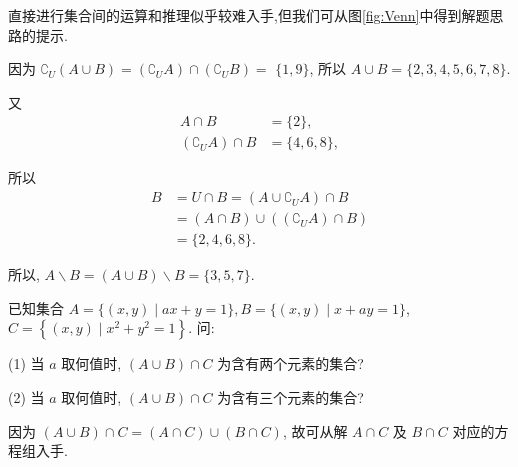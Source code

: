 \begin{analysis}
	直接进行集合间的运算和推理似乎较难入手,但我们可从图\ref{fig:Venn}中得到解题思路的提示.
\end{analysis}

\begin{solution}
	因为 $\complement_{U}(A \cup B)=\left(\complement_{U} A\right) \cap\left(\complement_{U} B\right)=$ $\{1,9\}$, 所以 $A \cup B=\{2,3,4,5,6,7,8\}$.

	又
	$$
		\begin{aligned}
			A \cap B                              & =\{2\},     \\
			\left(\complement_{U} A\right) \cap B & =\{4,6,8\},
		\end{aligned}
	$$




	所以
	$$
		\begin{aligned}
			B & =U \cap B=\left(A \cup \complement_{U} A\right) \cap B             \\
			  & =(A \cap B) \cup\left(\left(\complement_{U} A\right) \cap B\right) \\
			  & =\{2,4,6,8\} .
		\end{aligned}
	$$

	所以, $A \backslash B=(A \cup B) \backslash B=\{3,5,7\}$.

\end{solution}

\begin{example}
	已知集合 $A=\{(x, y) \mid a x+y=1\}, B=\{(x, y) \mid x+a y=1\}$, $C=\left\{(x, y) \mid x^{2}+y^{2}=1\right\}$. 问:

	(1) 当 $a$ 取何值时, $(A \cup B) \cap C$ 为含有两个元素的集合?

	(2) 当 $a$ 取何值时, $(A \cup B) \cap C$ 为含有三个元素的集合?

\end{example}

\begin{analysis}
	因为 $(A \cup B) \cap C=(A \cap C) \cup(B \cap C)$, 故可从解 $A \cap C$ 及 $B \cap C$ 对应的方程组入手.
\end{analysis}

